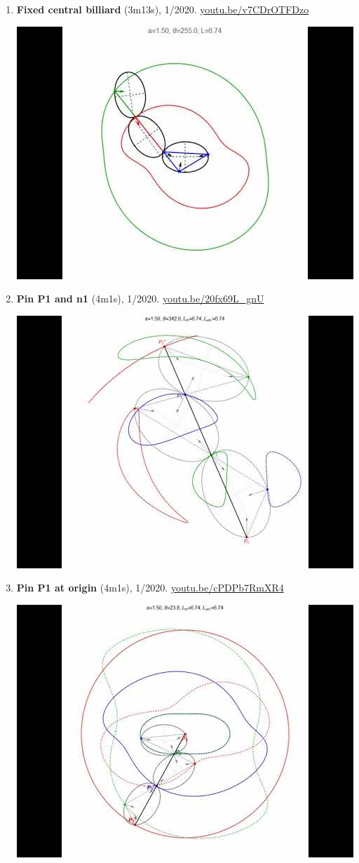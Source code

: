 \documentclass[12pt]{article}
\begin{document}
\begin{enumerate}[resume]
\item \textbf{Fixed central billiard} (3m13s), 1/2020. \href{https://youtu.be/v7CDrOTFDzo}{\url{youtu.be/v7CDrOTFDzo}}
\begin{center}\includegraphics[width=.5\textwidth]{pics/v7CDrOTFDzo.jpg}\end{center}
% 
\item \textbf{Pin P1 and n1} (4m1s), 1/2020. \href{https://youtu.be/20fx69L_gnU}{\url{youtu.be/20fx69L\_gnU}}
\begin{center}\includegraphics[width=.5\textwidth]{pics/20fx69L_gnU.jpg}\end{center}
% 
\item \textbf{Pin P1 at origin} (4m1s), 1/2020. \href{https://youtu.be/cPDPb7RmXR4}{\url{youtu.be/cPDPb7RmXR4}}
\begin{center}\includegraphics[width=.5\textwidth]{pics/cPDPb7RmXR4.jpg}\end{center}

\end{enumerate}
\end{document}
